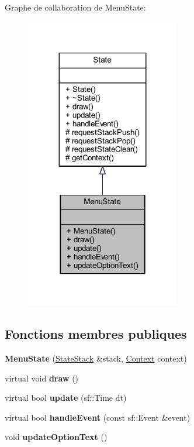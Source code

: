 Graphe de collaboration de Menu\+State\+:\nopagebreak
\begin{figure}[H]
\begin{center}
\leavevmode
\includegraphics[width=191pt]{class_menu_state__coll__graph}
\end{center}
\end{figure}
\subsection*{Fonctions membres publiques}
\begin{DoxyCompactItemize}
\item 
{\bfseries Menu\+State} (\hyperlink{class_state_stack}{State\+Stack} \&stack, \hyperlink{struct_state_1_1_context}{Context} context)\hypertarget{class_menu_state_a6e7034c57bf83f24aa8f4321d3d210a5}{}\label{class_menu_state_a6e7034c57bf83f24aa8f4321d3d210a5}

\item 
virtual void {\bfseries draw} ()\hypertarget{class_menu_state_aa557d6c3bf06bb3107ed780913a6b47f}{}\label{class_menu_state_aa557d6c3bf06bb3107ed780913a6b47f}

\item 
virtual bool {\bfseries update} (sf\+::\+Time dt)\hypertarget{class_menu_state_adac67748651bd33ddadb36a4f8a246da}{}\label{class_menu_state_adac67748651bd33ddadb36a4f8a246da}

\item 
virtual bool {\bfseries handle\+Event} (const sf\+::\+Event \&event)\hypertarget{class_menu_state_a04a21241cebf6a8f0fe8ee9ce895ef18}{}\label{class_menu_state_a04a21241cebf6a8f0fe8ee9ce895ef18}

\item 
void {\bfseries update\+Option\+Text} ()\hypertarget{class_menu_state_a6ebbcdc8f6e81cd654b8b7c9a5bbae09}{}\label{class_menu_state_a6ebbcdc8f6e81cd654b8b7c9a5bbae09}

\end{DoxyCompactItemize}
